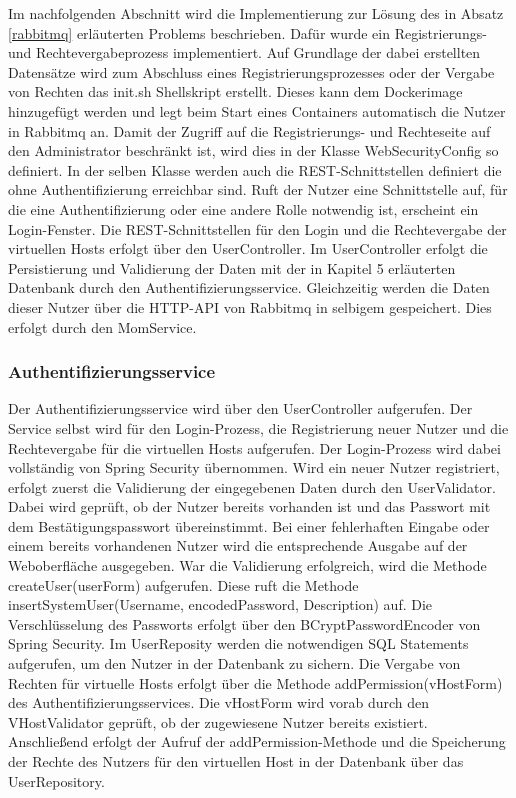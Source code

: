 Im nachfolgenden Abschnitt wird die Implementierung zur Lösung des in Absatz \ref{rabbitmq} erläuterten Problems beschrieben. Dafür wurde ein Registrierungs- und Rechtevergabeprozess implementiert. Auf Grundlage der dabei erstellten Datensätze wird zum Abschluss eines Registrierungsprozesses oder der Vergabe von Rechten das init.sh Shellskript erstellt. Dieses kann dem Dockerimage hinzugefügt werden und legt beim Start eines Containers automatisch die Nutzer in Rabbitmq an.
Damit der Zugriff auf die Registrierungs- und Rechteseite auf den Administrator beschränkt ist, wird dies in der Klasse WebSecurityConfig so definiert. In der selben Klasse werden auch die REST-Schnittstellen definiert die ohne Authentifizierung erreichbar sind. Ruft der Nutzer eine Schnittstelle auf, für die eine Authentifizierung oder eine andere Rolle notwendig ist, erscheint ein Login-Fenster. Die REST-Schnittstellen für den Login und die Rechtevergabe der virtuellen Hosts erfolgt über den UserController. Im UserController erfolgt die Persistierung und Validierung der Daten mit der in Kapitel 5 erläuterten Datenbank durch den Authentifizierungsservice. Gleichzeitig werden die Daten dieser Nutzer über die HTTP-API von Rabbitmq in selbigem gespeichert. Dies erfolgt durch den MomService.
\subsubsection{Authentifizierungsservice}\label{momservice}
Der Authentifizierungsservice wird über den UserController aufgerufen. Der Service selbst wird für den Login-Prozess, die Registrierung neuer Nutzer und die Rechtevergabe für die virtuellen Hosts aufgerufen. Der Login-Prozess wird dabei vollständig von Spring Security übernommen. Wird ein neuer Nutzer registriert, erfolgt zuerst die Validierung der eingegebenen Daten durch den UserValidator. Dabei wird geprüft, ob der Nutzer bereits vorhanden ist und das Passwort mit dem Bestätigungspasswort übereinstimmt. Bei einer fehlerhaften Eingabe oder einem bereits vorhandenen Nutzer wird die entsprechende Ausgabe auf der Weboberfläche ausgegeben. War die Validierung erfolgreich, wird die Methode createUser(userForm) aufgerufen. Diese ruft die Methode insertSystemUser(Username, encodedPassword, Description) auf. Die Verschlüsselung des Passworts erfolgt über den BCryptPasswordEncoder von Spring Security. Im UserReposity werden die notwendigen SQL Statements aufgerufen, um den Nutzer in der Datenbank zu sichern. Die Vergabe von Rechten für virtuelle Hosts erfolgt über die Methode addPermission(vHostForm) des Authentifizierungsservices. Die vHostForm wird vorab durch den VHostValidator geprüft, ob der zugewiesene Nutzer bereits existiert. Anschließend erfolgt der Aufruf der addPermission-Methode und die Speicherung der Rechte des Nutzers für den virtuellen Host in der Datenbank über das UserRepository.
